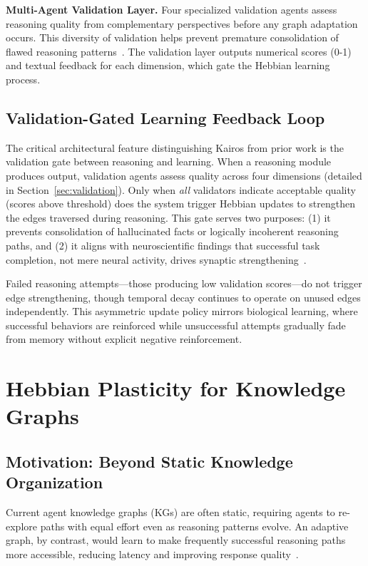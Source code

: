 \documentclass{article}
\begin{document}
\textbf{Multi-Agent Validation Layer.} Four specialized validation agents assess reasoning quality from complementary perspectives before any graph adaptation occurs. This diversity of validation helps prevent premature consolidation of flawed reasoning patterns~\citep{xu2025amem}. The validation layer outputs numerical scores (0-1) and textual feedback for each dimension, which gate the Hebbian learning process.

\subsection{Validation-Gated Learning Feedback Loop}

The critical architectural feature distinguishing Kairos from prior work is the validation gate between reasoning and learning. When a reasoning module produces output, validation agents assess quality across four dimensions (detailed in Section~\ref{sec:validation}). Only when \textit{all} validators indicate acceptable quality (scores above threshold) does the system trigger Hebbian updates to strengthen the edges traversed during reasoning. This gate serves two purposes: (1) it prevents consolidation of hallucinated facts or logically incoherent reasoning paths, and (2) it aligns with neuroscientific findings that successful task completion, not mere neural activity, drives synaptic strengthening~\citep{squire2015memory}.

Failed reasoning attempts—those producing low validation scores—do not trigger edge strengthening, though temporal decay continues to operate on unused edges independently. This asymmetric update policy mirrors biological learning, where successful behaviors are reinforced while unsuccessful attempts gradually fade from memory without explicit negative reinforcement.

\section{Hebbian Plasticity for Knowledge Graphs}
\label{sec:hebbian}

\subsection{Motivation: Beyond Static Knowledge Organization}

Current agent knowledge graphs (KGs) are often static, requiring agents to re-explore paths with equal effort even as reasoning patterns evolve. An adaptive graph, by contrast, would learn to make frequently successful reasoning paths more accessible, reducing latency and improving response quality~\citep{packer2023memgpt}.
\end{document}
